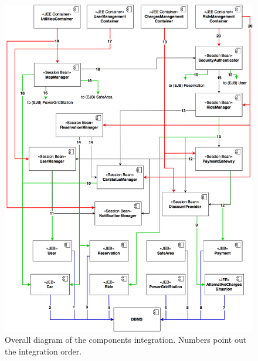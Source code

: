 \begin{figure}[H]
\begin{center}
		\includegraphics[width=\textwidth]{./integration_strategy/diagrams/overall.png}
		\caption{Overall diagram of the components integration. Numbers point out the integration order.}
\end{center}
\end{figure}


